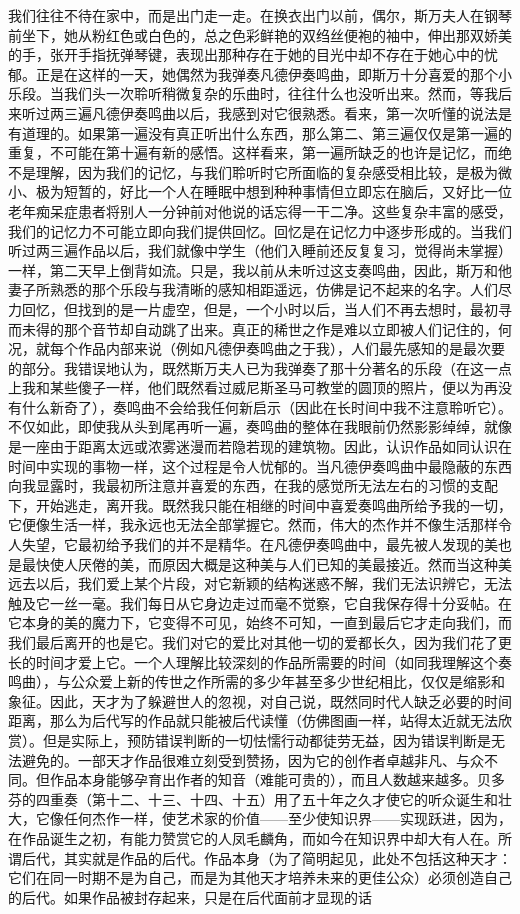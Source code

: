 \par 我们往往不待在家中，而是出门走一走。在换衣出门以前，偶尔，斯万夫人在钢琴前坐下，她从粉红色或白色的，总之色彩鲜艳的双绉丝便袍的袖中，伸出那双娇美的手，张开手指抚弹琴键，表现出那种存在于她的目光中却不存在于她心中的忧郁。正是在这样的一天，她偶然为我弹奏凡德伊奏鸣曲，即斯万十分喜爱的那个小乐段。当我们头一次聆听稍微复杂的乐曲时，往往什么也没听出来。然而，等我后来听过两三遍凡德伊奏鸣曲以后，我感到对它很熟悉。看来，第一次听懂的说法是有道理的。如果第一遍没有真正听出什么东西，那么第二、第三遍仅仅是第一遍的重复，不可能在第十遍有新的感悟。这样看来，第一遍所缺乏的也许是记忆，而绝不是理解，因为我们的记忆，与我们聆听时它所面临的复杂感受相比较，是极为微小、极为短暂的，好比一个人在睡眠中想到种种事情但立即忘在脑后，又好比一位老年痴呆症患者将别人一分钟前对他说的话忘得一干二净。这些复杂丰富的感受，我们的记忆力不可能立即向我们提供回忆。回忆是在记忆力中逐步形成的。当我们听过两三遍作品以后，我们就像中学生（他们入睡前还反复复习，觉得尚未掌握）一样，第二天早上倒背如流。只是，我以前从未听过这支奏鸣曲，因此，斯万和他妻子所熟悉的那个乐段与我清晰的感知相距遥远，仿佛是记不起来的名字。人们尽力回忆，但找到的是一片虚空，但是，一个小时以后，当人们不再去想时，最初寻而未得的那个音节却自动跳了出来。真正的稀世之作是难以立即被人们记住的，何况，就每个作品内部来说（例如凡德伊奏鸣曲之于我），人们最先感知的是最次要的部分。我错误地认为，既然斯万夫人已为我弹奏了那十分著名的乐段（在这一点上我和某些傻子一样，他们既然看过威尼斯圣马可教堂的圆顶的照片，便以为再没有什么新奇了），奏鸣曲不会给我任何新启示（因此在长时间中我不注意聆听它）。不仅如此，即使我从头到尾再听一遍，奏鸣曲的整体在我眼前仍然影影绰绰，就像是一座由于距离太远或浓雾迷漫而若隐若现的建筑物。因此，认识作品如同认识在时间中实现的事物一样，这个过程是令人忧郁的。当凡德伊奏鸣曲中最隐蔽的东西向我显露时，我最初所注意并喜爱的东西，在我的感觉所无法左右的习惯的支配下，开始逃走，离开我。既然我只能在相继的时间中喜爱奏鸣曲所给予我的一切，它便像生活一样，我永远也无法全部掌握它。然而，伟大的杰作并不像生活那样令人失望，它最初给予我们的并不是精华。在凡德伊奏鸣曲中，最先被人发现的美也是最快使人厌倦的美，而原因大概是这种美与人们已知的美最接近。然而当这种美远去以后，我们爱上某个片段，对它新颖的结构迷惑不解，我们无法识辨它，无法触及它一丝一毫。我们每日从它身边走过而毫不觉察，它自我保存得十分妥帖。在它本身的美的魔力下，它变得不可见，始终不可知，一直到最后它才走向我们，而我们最后离开的也是它。我们对它的爱比对其他一切的爱都长久，因为我们花了更长的时间才爱上它。一个人理解比较深刻的作品所需要的时间（如同我理解这个奏鸣曲），与公众爱上新的传世之作所需的多少年甚至多少世纪相比，仅仅是缩影和象征。因此，天才为了躲避世人的忽视，对自己说，既然同时代人缺乏必要的时间距离，那么为后代写的作品就只能被后代读懂（仿佛图画一样，站得太近就无法欣赏）。但是实际上，预防错误判断的一切怯懦行动都徒劳无益，因为错误判断是无法避免的。一部天才作品很难立刻受到赞扬，因为它的创作者卓越非凡、与众不同。但作品本身能够孕育出作者的知音（难能可贵的），而且人数越来越多。贝多芬的四重奏（第十二、十三、十四、十五）用了五十年之久才使它的听众诞生和壮大，它像任何杰作一样，使艺术家的价值——至少使知识界——实现跃进，因为，在作品诞生之初，有能力赞赏它的人凤毛麟角，而如今在知识界中却大有人在。所谓后代，其实就是作品的后代。作品本身（为了简明起见，此处不包括这种天才：它们在同一时期不是为自己，而是为其他天才培养未来的更佳公众）必须创造自己的后代。如果作品被封存起来，只是在后代面前才显现的话